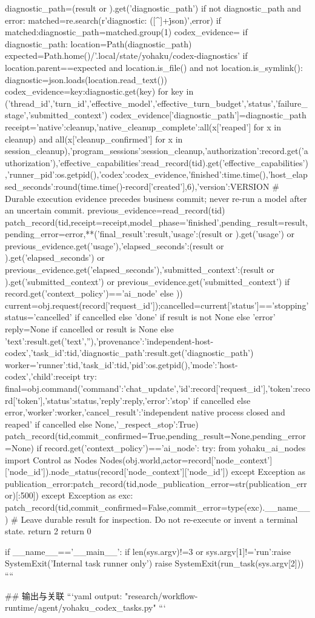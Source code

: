     diagnostic_path=(result or {}).get('diagnostic_path')
    if not diagnostic_path and error:
        matched=re.search(r'diagnostic: ([^\s]+\.json)',error)
        if matched:diagnostic_path=matched.group(1)
    codex_evidence={}
    if diagnostic_path:
        location=Path(diagnostic_path)
        expected=Path.home()/'.local/state/yohaku/codex-diagnostics'
        if location.parent==expected and location.is_file() and not location.is_symlink():
            diagnostic=json.loads(location.read_text())
            codex_evidence={key:diagnostic.get(key) for key in ('thread_id','turn_id','effective_model','effective_turn_budget','status','failure_stage','submitted_context')}
            codex_evidence['diagnostic_path']=diagnostic_path
    receipt={'native':cleanup,'native_cleanup_complete':all(x['reaped'] for x in cleanup) and all(x['cleanup_confirmed'] for x in session_cleanup),'program_sessions':session_cleanup,'authorization':record.get('authorization'),'effective_capabilities':read_record(tid).get('effective_capabilities'),'runner_pid':os.getpid(),'codex':codex_evidence,'finished':time.time(),'host_elapsed_seconds':round(time.time()-record['created'],6),'version':VERSION}
    # Durable execution evidence precedes business commit; never re-run a model after an uncertain commit.
    previous_evidence=read_record(tid)
    patch_record(tid,receipt=receipt,model_phase='finished',pending_result=result,pending_error=error,**({'final_result':result,'usage':(result or {}).get('usage') or previous_evidence.get('usage'),'elapsed_seconds':(result or {}).get('elapsed_seconds') or previous_evidence.get('elapsed_seconds'),'submitted_context':(result or {}).get('submitted_context') or previous_evidence.get('submitted_context')} if record.get('context_policy')=='ai_node' else {}))
    current=obj.request(record['request_id']);cancelled=current['status']=='stopping'
    status='cancelled' if cancelled else 'done' if result is not None else 'error'
    reply=None if cancelled or result is None else {'text':result.get('text',''),'provenance':'independent-host-codex','task_id':tid,'diagnostic_path':result.get('diagnostic_path')}
    worker={'runner':tid,'task_id':tid,'pid':os.getpid(),'mode':'host-codex','child':receipt}
    try:
        final=obj.command({'command':'chat_update','id':record['request_id'],'token':record['token'],'status':status,'reply':reply,'error':'stop' if cancelled else error,'worker':worker,'cancel_result':'independent native process closed and reaped' if cancelled else None,'_respect_stop':True})
        patch_record(tid,commit_confirmed=True,pending_result=None,pending_error=None)
        if record.get('context_policy')=='ai_node':
            try:
                from yohaku_ai_nodes import Control as Nodes
                Nodes(obj.world,actor=record['node_context']['node_id']).node_status(record['node_context']['node_id'])
            except Exception as publication_error:patch_record(tid,node_publication_error=str(publication_error)[:500])
    except Exception as exc:
        patch_record(tid,commit_confirmed=False,commit_error=type(exc).__name__)
        # Leave durable result for inspection. Do not re-execute or invent a terminal state.
        return 2
    return 0


if __name__=='__main__':
    if len(sys.argv)!=3 or sys.argv[1]!='run':raise SystemExit('Internal task runner only')
    raise SystemExit(run_task(sys.argv[2]))
````

## 输出与关联
```yaml
output: "research/workflow-runtime/agent/yohaku_codex_tasks.py"
```
